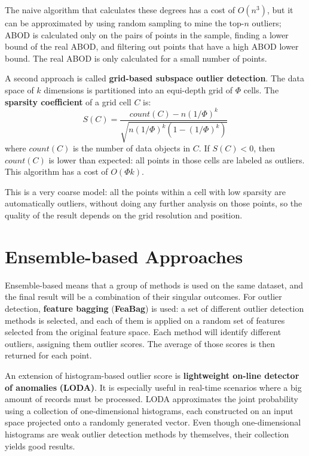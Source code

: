 The naive algorithm that calculates these degrees has a cost of $O(n^3)$, but it can be approximated by using random sampling to mine the top-$n$ outliers; ABOD is calculated only on the pairs of points in the sample, finding a lower bound of the real ABOD, and filtering out points that have a high ABOD lower bound. The real ABOD is only calculated for a small number of points.

A second approach is called \textbf{grid-based subspace outlier detection}. The data space of $k$ dimensions is partitioned into an equi-depth grid of $\Phi$ cells. The \textbf{sparsity coefficient} of a grid cell $C$ is:
\begin{equation*}
    S(C) = \dfrac{\textit{count}(C) - n (1/ \Phi)^k}{\sqrt{n(1/\Phi)^k (1-(1/\Phi)^k)}}
\end{equation*}
where $\textit{count}(C)$ is the number of data objects in $C$. If $S(C) < 0$, then $\textit{count}(C)$ is lower than expected: all points in those cells are labeled as outliers. This algorithm has a cost of $O(\Phi k)$.

This is a very coarse model: all the points within a cell with low sparsity are automatically outliers, without doing any further analysis on those points, so the quality of the result depends on the grid resolution and position. 

\section{Ensemble-based Approaches}

Ensemble-based means that a group of methods is used on the same dataset, and the final result will be a combination of their singular outcomes. For outlier detection, \textbf{feature bagging} (\textbf{FeaBag}) is used: a set of different outlier detection methods is selected, and each of them is applied on a random set of features selected from the original feature space. Each method will identify different outliers, assigning them outlier scores. The average of those scores is then returned for each point.

An extension of histogram-based outlier score is \textbf{lightweight on-line detector of anomalies} \textbf{(LODA)}. It is especially useful in real-time scenarios where a big amount of records must be processed. LODA approximates the joint probability using a collection of one-dimensional histograms, each constructed on an input space projected onto a randomly generated vector. Even though one-dimensional histograms are weak outlier detection methods by themselves, their collection yields good results.

